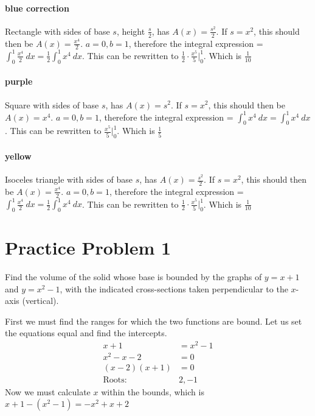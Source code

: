 \documentclass[letterpaper, 12pt]{article}
\begin{document}
\paragraph{blue correction}
Rectangle with sides of base $s$, height $\frac{s}{2}$, has $A(x)=\frac{s^2}{2}$. If $s=x^2$, this should then be $A(x)=\frac{x^4}{2}$. $a=0, b=1$, therefore the integral expression = $\int_{0}^{1}\frac{x^4}{2}\:dx=\frac{1}{2}\int_{0}^{1}x^4\:dx$. This can be rewritten to $\frac{1}{2}\cdot\frac{x^5}{5}\big|_{0}^{1}$. Which is $\frac{1}{10}$
\paragraph{purple}
Square with sides of base $s$, has $A(x)=s^2$. If $s=x^2$, this should then be $A(x)=x^4$. $a=0, b=1$, therefore the integral expression = $\int_{0}^{1}x^4\:dx=\int_{0}^{1}x^4\:dx$. This can be rewritten to $\frac{x^5}{5}\big|_{0}^{1}$. Which is $\frac{1}{5}$
\paragraph{yellow}
Isoceles triangle with sides of base $s$, has $A(x)=\frac{s^2}{2}$. If $s=x^2$, this should then be $A(x)=\frac{x^4}{2}$. $a=0, b=1$, therefore the integral expression = $\int_{0}^{1}\frac{x^4}{2}\:dx=\frac{1}{2}\int_{0}^{1}x^4\:dx$. This can be rewritten to $\frac{1}{2}\cdot\frac{x^5}{5}\big|_{0}^{1}$. Which is $\frac{1}{10}$
\section{Practice Problem 1}
Find the volume of the solid whose base is bounded by the graphs of $y=x+1$ and $y=x^2-1$, with the indicated cross-sections taken perpendicular to the $x$-axis (vertical).
\begin{center}
\end{center}
\par
First we must find the ranges for which the two functions are bound. Let us set the equations equal and find the intercepts.
\begin{align}
    x+1            & =x^2-1 \\
    x^2-x-2        & =0     \\
    (x-2)(x+1)     & =0     \\
    \text{Roots: } & 2, -1
\end{align}
Now we must calculate $x$ within the bounds, which is $x+1-(x^2-1) = -x^2+x+2$
\end{document}
